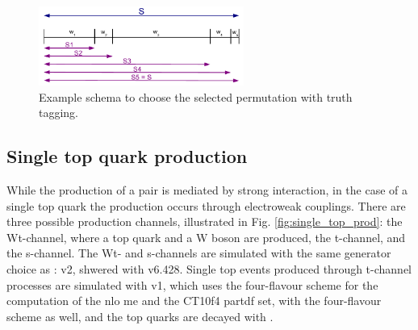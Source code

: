 \begin{figure}[h]
\centering 
\includegraphics[width=0.6\textwidth]{figures/susy_common/trf_perm}
\caption{Example schema to choose the selected permutation with truth tagging.}\label{fig:susy_common_trf_perm}
\end{figure}


\subsection{Single top quark production}

While the production of a \ttbar pair is mediated by strong interaction, in the case of a single top quark the production occurs through electroweak 
couplings. There are three possible production channels, illustrated in Fig. \ref{fig:single_top_prod}: the Wt-channel, where a top quark and a W boson are produced, the t-channel, and the s-channel. 
The Wt- and s-channels are simulated with the same generator choice as \ttbar: \PowhegBox v2, shwered with \PY v6.428.
Single top events produced through t-channel processes are simulated with \PowhegBox v1, which uses the four-flavour scheme for the computation of the \gls{nlo} \gls{me} and the CT10f4 \gls{partdf} set, with the four-flavour scheme as well, and the top quarks are decayed with \MadSpin \cite{Artoisenet:2012st}.

